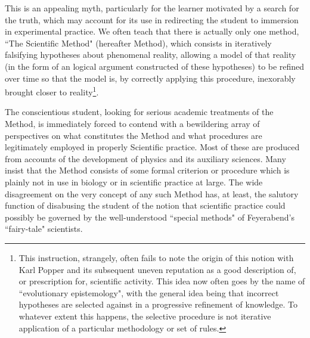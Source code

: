 This is an appealing myth, particularly for the learner motivated by a search for the truth, which may account for its use in redirecting the student to immersion in experimental practice. We often teach that there is actually only one method, ``The Scientific Method" (hereafter Method), which consists in iteratively falsifying hypotheses about phenomenal reality, allowing a model of that reality (in the form of an logical argument constructed of these hypotheses) to be refined over time so that the model is, by correctly applying this procedure, inexorably brought closer to reality\footnote{This instruction, strangely, often fails to note the origin of this notion with Karl Popper and its subsequent uneven reputation as a good description of, or prescription for, scientific activity. This idea now often goes by the name of ``evolutionary epistemology", with the general idea being that incorrect hypotheses are selected against in a progressive refinement of knowledge. To whatever extent this happens, the selective procedure is not iterative application of a particular methodology or set of rules.}.

The conscientious student, looking for serious academic treatments of the Method, is immediately forced to contend with a bewildering array of perspectives on what constitutes the Method and what procedures are legitimately employed in properly Scientific practice. Most of these are produced from accounts of the development of physics and its auxiliary sciences. Many insist that the Method consists of some formal criterion or procedure which is plainly not in use in biology or in scientific practice at large. The wide disagreement on the very concept of any such Method has, at least, the salutory function of disabusing the student of the notion that scientific practice could possibly be governed by the well-understood ``special methods" of Feyerabend's ``fairy-tale" scientists.

